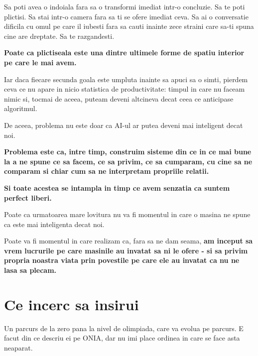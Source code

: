 Sa poti avea o indoiala fara sa o transformi imediat intr-o concluzie.
Sa te poti plictisi. Sa stai intr-o camera fara sa ti se ofere imediat
ceva. Sa ai o conversatie dificila cu omul pe care il iubesti fara sa
cauti inainte zece straini care sa-ti spuna cine are dreptate. Sa te
razgandesti.

\textbf{Poate ca plictiseala este una dintre ultimele forme de spatiu
interior pe care le mai avem.}

Iar daca fiecare secunda goala este umpluta inainte sa apuci sa o simti,
pierdem ceva ce nu apare in nicio statistica de productivitate: timpul
in care nu faceam nimic si, tocmai de aceea, puteam deveni altcineva
decat ceea ce anticipase algoritmul.

De aceea, problema nu este doar ca AI-ul ar putea deveni mai inteligent
decat noi.

\textbf{Problema este ca, intre timp, construim sisteme din ce in ce mai
bune la a ne spune ce sa facem, ce sa privim, ce sa cumparam, cu cine sa
ne comparam si chiar cum sa ne interpretam propriile relatii.}

\textbf{Si toate acestea se intampla in timp ce avem senzatia ca suntem
perfect liberi.}

Poate ca urmatoarea mare lovitura nu va fi momentul in care o masina ne
spune ca este mai inteligenta decat noi.

Poate va fi momentul in care realizam ca, fara sa ne dam seama,
\textbf{am inceput sa vrem lucrurile pe care masinile au invatat sa ni
le ofere - si sa privim propria noastra viata prin povestile pe care ele
au invatat ca nu ne lasa sa plecam.}

\section*{Ce incerc sa insirui}

Un parcurs de la zero pana la nivel de olimpiada, care va evolua pe
parcurs. E facut din ce descriu ei pe ONIA, dar nu imi place ordinea in
care se face asta neaparat.

